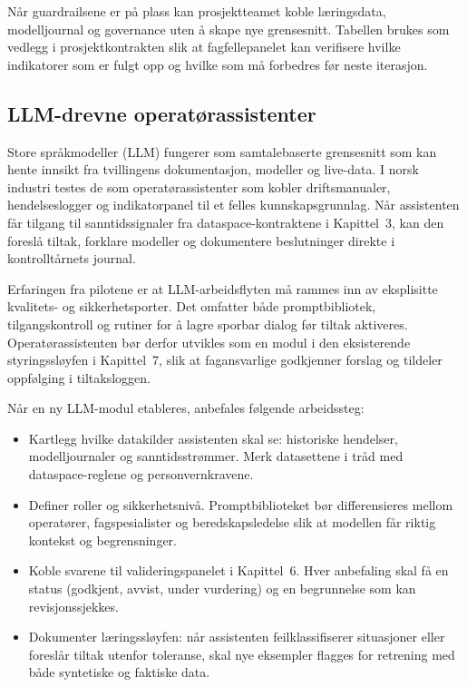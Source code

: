 Når guardrailsene er på plass kan prosjektteamet koble læringsdata, modelljournal og governance uten å skape nye grensesnitt. Tabellen brukes som vedlegg i prosjektkontrakten slik at fagfellepanelet kan verifisere hvilke indikatorer som er fulgt opp og hvilke som må forbedres før neste iterasjon.

\subsection{LLM-drevne operatørassistenter}
Store språkmodeller (LLM) fungerer som samtalebaserte grensesnitt som kan hente innsikt fra tvillingens dokumentasjon, modeller og live-data.\citep{openai2024gpt4o} I norsk industri testes de som operatørassistenter som kobler driftsmanualer, hendelseslogger og indikatorpanel til et felles kunnskapsgrunnlag. Når assistenten får tilgang til sanntidssignaler fra dataspace-kontraktene i Kapittel~3, kan den foreslå tiltak, forklare modeller og dokumentere beslutninger direkte i kontrolltårnets journal.

Erfaringen fra pilotene er at LLM-arbeidsflyten må rammes inn av eksplisitte kvalitets- og sikkerhetsporter.\citep{dnv2023digitalassurance,microsoft2023copilot} Det omfatter både promptbibliotek, tilgangskontroll og rutiner for å lagre sporbar dialog før tiltak aktiveres. Operatørassistenten bør derfor utvikles som en modul i den eksisterende styringssløyfen i Kapittel~7, slik at fagansvarlige godkjenner forslag og tildeler oppfølging i tiltaksloggen.

Når en ny LLM-modul etableres, anbefales følgende arbeidssteg:
\begin{itemize}
    \item Kartlegg hvilke datakilder assistenten skal se: historiske hendelser, modelljournaler og sanntidsstrømmer. Merk datasettene i tråd med dataspace-reglene og personvernkravene.
    \item Definer roller og sikkerhetsnivå. Promptbiblioteket bør differensieres mellom operatører, fagspesialister og beredskapsledelse slik at modellen får riktig kontekst og begrensninger.
    \item Koble svarene til valideringspanelet i Kapittel~6. Hver anbefaling skal få en status (godkjent, avvist, under vurdering) og en begrunnelse som kan revisjonssjekkes.
    \item Dokumenter læringssløyfen: når assistenten feilklassifiserer situasjoner eller foreslår tiltak utenfor toleranse, skal nye eksempler flagges for retrening med både syntetiske og faktiske data.
\end{itemize}

